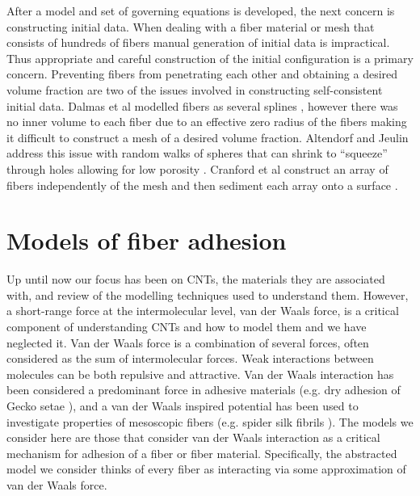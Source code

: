	After a model and set of governing equations is developed, the next concern is constructing initial data. When dealing with a fiber material or mesh that consists of hundreds of fibers manual generation of initial data is impractical. Thus appropriate and careful construction of the initial configuration is a primary concern. Preventing fibers from penetrating each other and obtaining a desired volume fraction are two of the issues involved in constructing self-consistent initial data. Dalmas et al modelled fibers as several splines \cite{Dalmas2006}, however there was no inner volume to each fiber due to an effective zero radius of the fibers making it difficult to construct a mesh of a desired volume fraction. Altendorf and Jeulin address this issue with random walks of spheres that can shrink to ``squeeze'' through holes allowing for low porosity \cite{Altendorf2011}. Cranford et al construct an array of fibers independently of the mesh and then sediment each array onto a surface \cite{Cranford2010}.
	


\section{Models of fiber adhesion}


	Up until now our focus has been on CNTs, the materials they are associated with, and review of the modelling techniques used to understand them. However, a short-range force at the intermolecular level, van der Waals force, is a critical component of understanding CNTs and how to model them and we have neglected it. Van der Waals force is a combination of several forces, often considered as the sum of intermolecular forces. Weak interactions between molecules can be both repulsive and attractive. Van der Waals interaction has been considered a predominant force in adhesive materials (e.g. dry adhesion of Gecko setae \cite{Autumn2002}), and a van der Waals inspired potential has been used to investigate properties of mesoscopic fibers (e.g. spider silk fibrils \cite{Cranford2013}). The models we consider here are those that consider van der Waals interaction as a critical mechanism for adhesion of a fiber or fiber material. Specifically, the abstracted model we consider thinks of every fiber as interacting via some approximation of van der Waals force.
	
